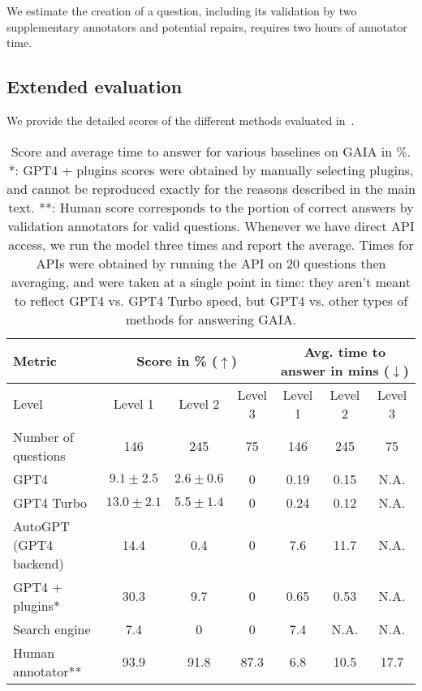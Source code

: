 \documentclass{fairmeta}
\newcommand{\benchmark}{\textsc{GAIA}}
\begin{document}
We estimate the creation of a question, including its validation by two supplementary annotators and potential repairs, requires two hours of annotator time.
\vspace{-.2cm}
\subsection{Extended evaluation}
\label{sec:extended_evaluation}
\vspace{-.2cm}
We provide the detailed scores of the different methods evaluated in~.


\begin{table}[]
\small
    \centering
    \begin{tabular}{lcccccc}
        \toprule
         Metric & \multicolumn{3}{c}{Score in \% ($\uparrow$)} & \multicolumn{3}{c}{Avg. time to answer in mins ($\downarrow$)} \\
        \midrule
         Level & Level 1 & Level 2 & Level 3 & Level 1 & Level 2 & Level 3 \\
         \midrule
        Number of questions & 146 & 245 & 75 & 146 & 245 & 75 \\
        \midrule 
        GPT4 & $9.1 \pm 2.5$ & $2.6 \pm 0.6$ & 0 & 0.19 & 0.15 & N.A.\\
        GPT4 Turbo & $13.0 \pm 2.1$ & $5.5 \pm 1.4$ & 0 & 0.24 & 0.12 & N.A. \\
        AutoGPT (GPT4 backend) & 14.4 & 0.4 & 0 & 7.6 & 11.7 & N.A. \\
        GPT4 + plugins* & 30.3 & 9.7 & 
        0 & 0.65 & 0.53 & N.A. \\
        \midrule
        Search engine & 7.4 & 0 & 0 & 7.4 & N.A. & N.A. \\
        Human annotator** & 93.9 & 91.8 & 87.3 & 6.8 & 10.5 & 17.7 \\

        \bottomrule
    \end{tabular}
    \caption{Score and average time to answer for various baselines on GAIA in \%. *: GPT4 + plugins scores were obtained by manually selecting plugins, and cannot be reproduced exactly for the reasons described in the main text. **: Human score corresponds to the portion of correct answers by validation annotators for valid questions. Whenever we have direct API access, we run the model three times and report the average. Times for APIs were obtained by running the API on 20 questions then averaging, and were taken at a single point in time: they aren't meant to reflect GPT4 vs. GPT4 Turbo speed, but GPT4 vs. other types of methods for answering \benchmark{}.}
    \label{tab:detailed_eval_results}
\end{table}
\end{document}
